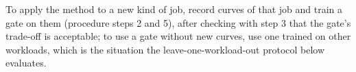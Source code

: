 To apply the method to a new kind of job, record curves of that job and train a gate on them (procedure steps 2 and 5), after checking with step 3 that the gate's trade-off is acceptable; to use a gate without new curves, use one trained on other workloads, which is the situation the leave-one-workload-out protocol below evaluates.
